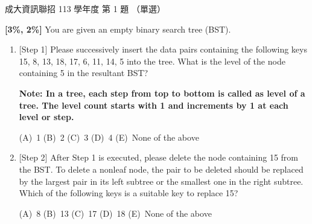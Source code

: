 \begin{pastexam}[label={px:ncku-113-prog-01}]{成大資訊聯招 113 學年度 第 1 題}
（單選）

\textbf{[3\%, 2\%]} You are given an empty binary search tree (BST).
\begin{enumerate}[label=\roman*)]
\item {[Step 1]} Please successively insert the data pairs containing the following keys 15, 8,
13, 18, 17, 6, 11, 14, 5 into the tree. What is the level of the node containing 5 in the
resultant BST?

\textbf{Note: In a tree, each step from top to bottom is called as level of a tree. The level
count starts with 1 and increments by 1 at each level or step.}

(A)~1 \qquad (B)~2 \qquad (C)~3 \qquad (D)~4 \qquad (E)~None of the above
\item {[Step 2]} After Step 1 is executed, please delete the node containing 15 from the BST. To
delete a nonleaf node, the pair to be deleted should be replaced by the largest pair in its left
subtree or the smallest one in the right subtree. Which of the following keys is a suitable key
to replace 15?

(A)~8 \qquad (B)~13 \qquad (C)~17 \qquad (D)~18 \qquad (E)~None of the above
\end{enumerate}
\end{pastexam}

